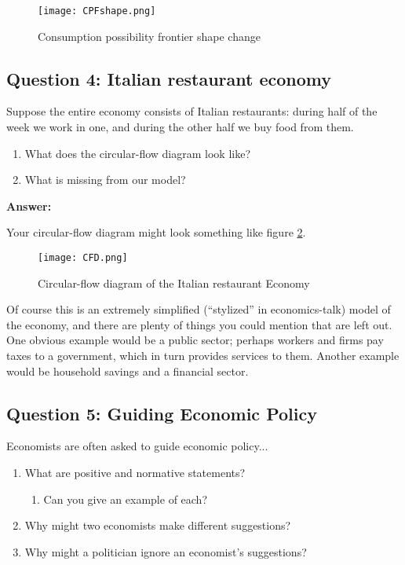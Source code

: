 \documentclass[12pt]{article}
\begin{document}
\begin{figure}[H]
    \centering
    \texttt{[image: CPFshape.png]}
    \caption{Consumption possibility frontier shape change}
    \label{fig:CPFshape}
\end{figure}

\subsection*{Question 4: Italian restaurant economy}
Suppose the entire economy consists of Italian restaurants: during half of the week we work in one, and during the other half we buy food from them.
\begin{enumerate}
    \item What does the circular-flow diagram look like?
    \item What is missing from our model?
\end{enumerate}

\medskip

\textbf{Answer:}

Your circular-flow diagram might look something like figure \ref{fig:CFD}.

\begin{figure}[H]
    \centering
    \texttt{[image: CFD.png]}
    \caption{Circular-flow diagram of the Italian restaurant Economy}
    \label{fig:CFD}
\end{figure}

Of course this is an extremely simplified (``stylized'' in economics-talk) model of the economy, and there are plenty of things you could mention that are left out. One obvious example would be a public sector; perhaps workers and firms pay taxes to a government, which in turn provides services to them. Another example would be household savings and a financial sector.

\medskip

\subsection*{Question 5: Guiding Economic Policy}
Economists are often asked to guide economic policy...
\medskip
\begin{enumerate}
    \item What are positive and normative statements?
    \begin{enumerate}
        \item Can you give an example of each?
    \end{enumerate}
    \item Why might two economists make different suggestions?
    \item Why might a politician ignore an economist's suggestions?
\end{enumerate}
\end{document}
